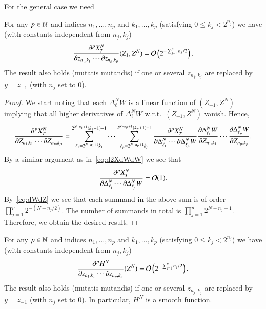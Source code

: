 \documentclass{amsart}
\begin{document}
For the general case we need
\begin{lemma}
  \label{lem:d2XdZ2}
  For any $p \in \mathbb{N}$ and indices $n_1, \ldots, n_p$ and $k_1, \ldots, k_p$
  (satisfying $0 \le k_j < 2^{n_j}$) we have (with constants independent from
  $n_j, k_j$)
  \begin{equation*}
    \frac{\partial^p X^N_T}{\partial z_{n_1,k_1} \cdots \partial z_{n_p,k_p}} (Z_1, Z^N) =
    \mathcal{O}\left( 2^{-\sum_{j=1}^p n_j/2} \right).
  \end{equation*}
  The result also holds (mutatis mutandis) if one or several $z_{n_j,k_j}$ are
  replaced by $y = z_{-1}$ (with $n_j$ set to $0$).
\end{lemma}
\begin{proof}
  We start noting that each $\Delta^N_\ell W$ is a linear function of
  $(Z_{-1},Z^N)$ implying that all higher derivatives of $\Delta^N_\ell W$
  w.r.t.~$(Z_{-1},Z^N)$ vanish. Hence,
  \begin{equation*}
    \frac{\partial^p X^N_T}{\partial Z_{n_1,k_1} \cdots \partial Z_{n_p,k_p}} = \sum_{\ell_1 =
      2^{N-n_1+1} k_1}^{2^{N-n_1+1}(k_1+1) - 1} \cdots \sum_{\ell_p =
      2^{N-n_p+1} k_p}^{2^{N-n_p+1}(k_p+1) - 1} \frac{\partial^p X^N_T}{\partial
      \Delta^N_{\ell_1} \cdots \partial \Delta^N_{\ell_p} W} \frac{\partial
      \Delta^N_{\ell_1} W}{\partial Z_{n_1,k_1}} \cdots \frac{\partial
      \Delta^N_{\ell_p}W}{\partial Z_{n_p,k_p}}.
  \end{equation*}
  By a similar argument as in~\eqref{eq:d2XdWdW} we see that
  \begin{equation*}
    \frac{\partial^p X^N_T}{\partial \Delta^N_{\ell_1} \cdots \partial \Delta^N_{\ell_p} W} = \mathcal{O}(1).
  \end{equation*}
  By~\eqref{eq:dWdZ} we see that each summand in the above sum is of order
  $\prod_{j=1}^p 2^{-(N-n_j/2)}$. The number of summands in total is
  $\prod_{j=1}^p 2^{N-n_j+1}$. Therefore, we obtain the desired result. 
\end{proof}

\begin{theorem}
  \label{thr:smoothness}
  For any $p \in \mathbb{N}$ and indices $n_1, \ldots, n_p$ and $k_1, \ldots, k_p$
  (satisfying $0 \le k_j < 2^{n_j}$) we have (with constants independent from
  $n_j, k_j$)
  \begin{equation*}
    \frac{\partial^p H^N}{\partial z_{n_1,k_1} \cdots \partial z_{n_p,k_p}}(Z^N) = 
    \mathcal{O}\left( 2^{-\sum_{j=1}^p n_j/2} \right).
  \end{equation*}
  The result also holds (mutatis mutandis) if one or several $z_{n_j,k_j}$ are
  replaced by $y = z_{-1}$ (with $n_j$ set to $0$). In particular, $H^N$ is a
  smooth function.
\end{theorem}
\end{document}
